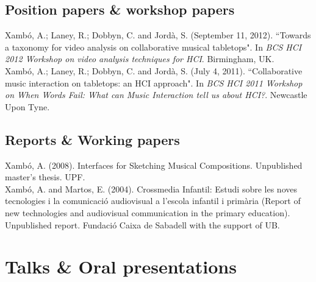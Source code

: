 \documentclass[10pt, a4paper]{article}
\newcommand{\years}[1]{\marginnote{\scriptsize #1}}
\begin{document}
\subsection*{Position papers \& workshop papers}
\noindent

\years{2012}Xambó, A.; Laney, R.; Dobbyn, C. and Jordà, S. (September 11, 2012). “Towards a taxonomy for video analysis on collaborative musical tabletops". In \emph{BCS HCI 2012 Workshop on video analysis techniques for HCI}. Birmingham, UK.\\
\years{2011}Xambó, A.; Laney, R.; Dobbyn, C. and Jordà, S. (July 4, 2011). “Collaborative music interaction on tabletops: an HCI approach". In \emph{BCS HCI 2011 Workshop on When Words Fail: What can Music Interaction tell us about HCI?}. Newcastle Upon Tyne.

\subsection*{Reports \& Working papers}
\noindent

\years{2008}Xambó, A. (2008). Interfaces for Sketching Musical Compositions. Unpublished master's thesis. UPF.\\ 
\years{2004}Xambó, A. and Martos, E. (2004). Crossmedia Infantil: Estudi sobre les noves tecnologies i la comunicació audiovisual a l'escola infantil i primària (Report of new technologies and audiovisual communication in the primary education). Unpublished report. Fundació Caixa de Sabadell with the support of UB.

\section*{Talks \& Oral presentations}
\end{document}
